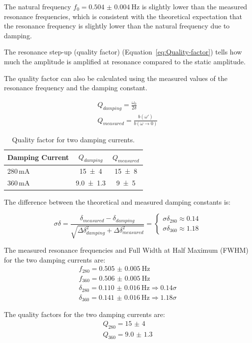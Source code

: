 \documentclass[12pt,a4paper,titlepage]{scrartcl}
\numberwithin{equation}{section}
\numberwithin{table}{section}
\numberwithin{figure}{section}
\begin{document}
The natural frequency $f_0 = \qty{0.504(4)}{\hertz}$ is slightly lower than the measured resonance frequencies, which is consistent with the theoretical expectation that the resonance frequency is slightly lower than the natural frequency due to damping.

The resonance step-up (quality factor) (Equation~\ref{eq:Quality-factor}) tells how much the amplitude is amplified at resonance compared to the static amplitude.

The quality factor can also be calculated using the measured values of the resonance frequency and the damping constant. 

\begin{align}
    Q_{damping} = \frac{\omega_0}{2\delta}\\
    Q_{measured} = \frac{b(\omega')}{b(\omega \rightarrow 0)}
\end{align}

\begin{table}[H]
    \centering
    \caption{Quality factor for two damping currents.}\label{tab:quality_factor}
    \begin{tabular}{lcc}
        \toprule
        \textbf{Damping Current} & \textbf{$Q_{damping}$} & \textbf{$Q_{measured}$} \\
        \midrule
        280\,mA & \num{15(4)} & \num{15(8)}\\
        360\,mA & \num{9.0(13)} & \num{9(5)}\\
        \bottomrule
    \end{tabular}
\end{table}

The difference between the theoretical and measured damping constants is:

\begin{equation}
    \sigma \delta = \frac{\delta_{measured} - \delta_{damping}}{\sqrt{\Delta \delta_{damping} ^2 + \Delta \delta_{measured}^2}} = \begin{cases}
        \sigma \delta_{280} \approx 0.14\\
        \sigma \delta_{360} \approx 1.18
    \end{cases}
\end{equation}

\begin{resultbox}[Result]
    The measured resonance frequencies and Full Width at Half Maximum (FWHM) for the two damping currents are:
    \begin{align}
        f_{280} = \qty{0.505(5)}{\hertz}\\
        f_{360} = \qty{0.506(5)}{\hertz}\\
        \delta_{280} = \qty{0.110(16)}{\hertz} \Rightarrow 0.14\sigma\\
        \delta_{360} = \qty{0.141(16)}{\hertz} \Rightarrow 1.18\sigma
    \end{align} 

    The quality factors for the two damping currents are:
    \begin{align}
        Q_{280} = \num{15(4)}\\
        Q_{360} = \num{9.0(13)}
    \end{align}
\end{resultbox}
\end{document}

